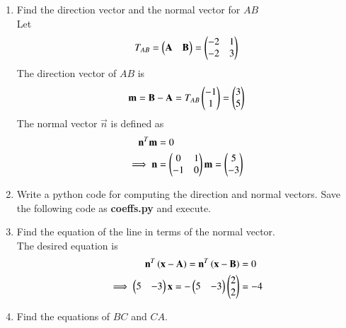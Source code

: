 \documentclass[journal,12pt,twocolumn]{IEEEtran}
\renewcommand\thesection{\arabic{section}}
\begin{document}
\begin{enumerate}[label=\thesection.\arabic*
,ref=\thesection.\theenumi]
\begin{align}
\\
&= -\myvec{2\\2}+ \lambda_1\myvec{3\\5}
\end{align}
%
\item Find the direction vector and the normal vector for $AB$
\\
\solution Let
\begin{align}
T_{AB} = \begin{pmatrix}\mathbf{A} & \mathbf{B}\end{pmatrix} = \begin{pmatrix}-2 & 1\\ -2 & 3\end{pmatrix}
\end{align}
The direction vector of $AB$ is 
\begin{equation}
\label{eq:dir_vec}
\mathbf{m} = \mathbf{B}-\mathbf{A} = T_{AB} \begin{pmatrix}-1 \\ 1\end{pmatrix} = \begin{pmatrix}3\\5\end{pmatrix}
\end{equation}
%
The normal vector $\vec{n}$ is defined as
\begin{align}
\label{eq:line_nor}
\mathbf{n}^T\mathbf{m} &= 0
\\
\implies \mathbf{n}&= \begin{pmatrix}0 & 1 \\ -1 & 0\end{pmatrix}\mathbf{m} = \begin{pmatrix}5\\-3\end{pmatrix}
\end{align}
%
\item Write a python code for computing the direction and normal vectors. 
%
\solution 
Save the following code  as \textbf{coeffs.py} and execute.
\label{prob:line_eq}


\item Find the equation of the line in terms of the normal 
vector.
\\
\solution The desired equation is
\begin{align}
\label{eq:line_norm}
\mathbf{n}^T\left(\mathbf{x} - \mathbf{A}\right)=\mathbf{n}^T\left(\mathbf{x} - \mathbf{B}\right)&= 0
\\
\implies \begin{pmatrix}5&-3\end{pmatrix}\mathbf{x} = -\begin{pmatrix}5&-3\end{pmatrix}\begin{pmatrix}2\\2\end{pmatrix} &= -4
\end{align}
%
\item
%
Find the equations of $BC$ and $CA$.
\end{enumerate}
\end{document}
